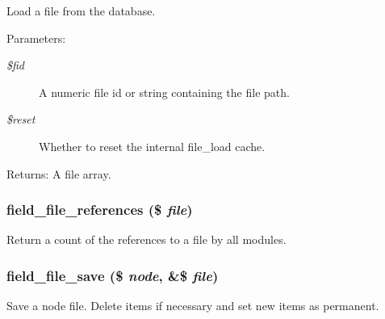 Load a file from the database.

\begin{Desc}
\item[Parameters:]
\begin{description}
\item[{\em \$fid}]A numeric file id or string containing the file path. \item[{\em \$reset}]Whether to reset the internal file\_\-load cache. \end{description}
\end{Desc}
\begin{Desc}
\item[Returns:]A file array. \end{Desc}
\hypertarget{field__file_8inc_2750f1d216388271938e7c9b545d2695}{
\subsubsection[{field\_\-file\_\-references}]{\setlength{\rightskip}{0pt plus 5cm}field\_\-file\_\-references (\$ {\em file})}}
\label{field__file_8inc_2750f1d216388271938e7c9b545d2695}


Return a count of the references to a file by all modules. \hypertarget{field__file_8inc_10fec707b6053febac35f742ea14a638}{
\subsubsection[{field\_\-file\_\-save}]{\setlength{\rightskip}{0pt plus 5cm}field\_\-file\_\-save (\$ {\em node}, \/  \&\$ {\em file})}}
\label{field__file_8inc_10fec707b6053febac35f742ea14a638}


Save a node file. Delete items if necessary and set new items as permanent.

